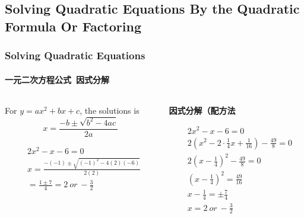 \documentclass[
	11pt, %
]{beamer}
\begin{document}

\subsection{Solving Quadratic Equations By the Quadratic Formula Or Factoring}



\begin{frame}
	\frametitle{Solving Quadratic Equations}
	\framesubtitle{一元二次方程公式\ 因式分解}

	\begin{columns}[t] 
		\begin{column}{0.5\textwidth} %
				\begin{theorem}[一元二次方程公式]
					For $y = ax^2 + bx + c$, the solutions is \\
					\begin{equation*}
						x=\frac{-b \pm \sqrt{b^2 - 4ac}}{2a}
					\end{equation*}
				\end{theorem}

				\begin{example}
					\begin{equation*}
						\begin{aligned}
							&2x^2 -x - 6 = 0 \\
							&x = \frac{-(-1) \pm \sqrt{(-1)^2 - 4(2)(-6)}}{2(2)} \\
							&= \frac{1 \pm 7}{4} = 2\ or\ -\frac{3}{2} 
						\end{aligned}
					\end{equation*}
				\end{example}
		\end{column}
		\begin{column}{0.45\textwidth} %
				\textbf{因式分解（配方法}

				\begin{example}
					\begin{equation*}
						\begin{aligned}
							&2x^2 -x - 6 = 0 \\
							&2(x^2 - 2 \cdot \frac{1}{4}x +  \frac{1}{16})-\frac{49}{8} = 0 \\
							&2(x - \frac{1}{4})^2-\frac{49}{8} = 0 \\
							&(x - \frac{1}{4})^2=\frac{49}{16} \\
							& x - \frac{1}{4}=\pm \frac{7}{4} \\
							&x = 2 \ or \ -\frac{3}{2}
						\end{aligned}
					\end{equation*}
				\end{example}
    \end{column}
	\end{columns}
\end{frame}
\end{document}
